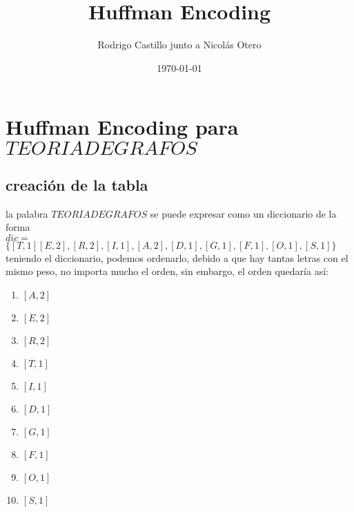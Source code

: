 \documentclass[10pt,a4paper]{article} %
\begin{document}
    \title{{  Huffman Encoding  }}
    \author{{Rodrigo Castillo junto a Nicolás Otero}}
    \date{\today}

    \maketitle



    \section{Huffman Encoding para $TEORIADEGRAFOS$}
        \subsection{creación de la tabla}
        la palabra $TEORIADEGRAFOS$ se puede expresar como un diccionario de la
        forma
        \\
        $dic = $$\{[T,1] [E,2] , [R ,2] , [I,1] , [A,2] , [D,1] , [G,1] , [F,1] ,
        [O,1] , [S,1]\}$
        \\
        teniendo el diccionario, podemos ordenarlo, debido a que hay tantas
        letras con el mismo peso, no importa mucho el orden, sin embargo, el
        orden quedaría así:
        \begin{enumerate}
        \item {$[A,2]$}
        \item {$[E,2]$}
        \item {$[R,2]$}

        \item {$[T,1]$}
        \item {$[I,1]$}
        \item {$[D,1]$}
        \item {$[G,1]$}
        \item {$[F,1]$}
        \item {$[O,1]$}
        \item {$[S,1]$}
        \end{enumerate}
\end{document}
